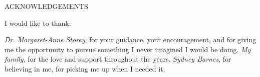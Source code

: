 \newpage
{}

\begin{center}
ACKNOWLEDGEMENTS
\end{center}

\noindent I would like to thank:
\begin{description}
\emph{Dr. Margaret-Anne Storey}, for your guidance, your encouragement, and for giving me the opportunity to pursue something I never imagined I would be doing.
\emph{My family}, for the love and support throughout the years.
\emph{Sydney Barnes}, for believing in me, for picking me up when I needed it, 
\end{description}

